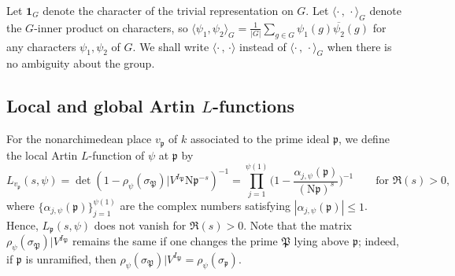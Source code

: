 \documentclass[12pt]{amsart}
\theoremstyle{definition} \newtheorem{definition}[theorem]{Definition}
\theoremstyle{example} \newtheorem{example}[theorem]{Example}
\theoremstyle{remark} \newtheorem{remark}{Remark}[theorem]
\numberwithin{equation}{section}
\numberwithin{theorem}{section}
\renewcommand{\leq}{\leqslant}
\newcommand{\N}{\mathrm{N}} %
\newcommand{\kp}{\mathfrak{p}}
\begin{document}
Let $\mathbf{1}_G$ denote the character of the trivial representation on $G$. Let $\langle \cdot \, ,\,  \cdot \rangle_G$  denote the $G$-inner product on characters, so $\langle \psi_1, \psi_2 \rangle_G =  \frac{1}{|G|}\sum_{g \in G} \psi_1(g) \overline{\psi_2}(g)$ for any characters $\psi_1,\psi_2$ of $G$. We shall write $\langle \cdot \, ,\,  \cdot \rangle$ instead of $\langle \cdot \, ,\,  \cdot \rangle_G$ when there is no ambiguity about the group.

\subsection{Local and global Artin $L$-functions}
For the nonarchimedean place $v_{\kp}$ of $k$ associated to the prime ideal $\kp$, we define the local Artin $L$-function of $\psi$ at $\mathfrak{p}$ by  
\begin{equation}
	\label{eqn:Artin-LocalDefinition}
L_{v_{\kp}}(s,\psi)=\det(1 - \rho_{\psi}(\sigma_{\mathfrak{P}})|V^{I_{\mathfrak{P}}}\N \kp^{-s})^{-1} = \prod_{j=1}^{\psi(1)} \Big(1 - \frac{\alpha_{j,\psi}(\mathfrak{p})}{(\mathrm{N}\mathfrak{p})^s} \Big)^{-1} \qquad \text{for } \Re(s) > 0,
\end{equation}
where  $\{ \alpha_{j,\psi}(\mathfrak{p}) \}_{j=1}^{\psi(1)}$ are the complex numbers satisfying $|\alpha_{j,\psi}(\mathfrak{p})| \leq 1$. Hence,  $L_{\mathfrak{p}}(s,\psi)$ does not vanish for $\Re(s) > 0$. Note that the matrix $\rho_{\psi}(\sigma_{\mathfrak{P}})|V^{I_{\mathfrak{P}}}$ remains the same if one changes the prime $\mathfrak{P}$ lying above $\kp$; indeed, if $\kp$ is unramified, then $\rho_{\psi}(\sigma_{\mathfrak{P}})|V^{I_{\mathfrak{P}}}=\rho_{\psi}(\sigma_{\kp})$.  
\end{document}
